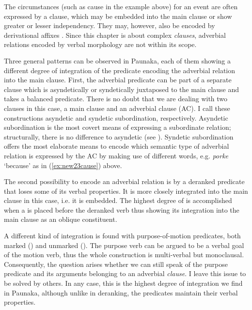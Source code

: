 The circumstances (such as cause in the example above) for an event are often expressed by a clause, which may be embedded into the main clause or show greater or lesser independency. They may, however, also be encoded by derivational affixes \citep[192]{Lehmann1988}. Since this chapter is about complex \textit{clauses}, adverbial relations encoded by verbal morphology are not within its scope. 

Three general patterns can be observed in Paunaka, each of them showing a different degree of integration of the predicate encoding the adverbial relation into the main clause. First, the adverbial predicate can be part of a separate clause which is asyndetically or syndetically juxtaposed to the main clause and takes a balanced predicate. There is no doubt that we are dealing with two clauses in this case, a main clause and an adverbial clause (AC). I call these constructions asyndetic and syndetic subordination, respectively. Asyndetic subordination is the most covert means of expressing a subordinate relation; structurally, there is no difference to asyndetic  (see ). Syndetic subordination offers the most elaborate means to encode which semantic type of adverbial relation is expressed by the AC by making use of different  words, e.g. \textit{porke} ‘because’ as in (\ref{ex:new23cause}) above. 

The second possibility to encode an adverbial relation is by a deranked predicate that loses some of its verbal properties. It is more closely integrated into the main clause in this case, i.e. it is embedded. The highest degree of  is accomplished when a  is placed before the deranked verb thus showing its integration into the main clause as an oblique constituent.

A different kind of integration is found with purpose-of-motion predicates, both marked () and unmarked (). The purpose verb can be argued to be a verbal goal  of the motion verb, thus the whole construction is multi-verbal but monoclausal. Consequently, the question arises whether we can still speak of the purpose predicate and its arguments belonging to an adverbial \textit{clause}. I leave this issue to be solved by others. In any case, this is the highest degree of integration we find in Paunaka, although unlike in deranking, the predicates maintain their verbal properties.

